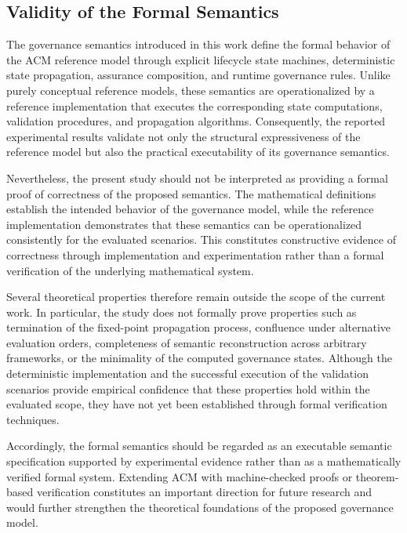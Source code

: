 \documentclass[10pt]{article}
\begin{document}
\subsection{Validity of the Formal Semantics}
\label{sec:validity_formal_semantics}

The governance semantics introduced in this work define the formal behavior of the ACM reference model through explicit lifecycle state machines, deterministic state propagation, assurance composition, and runtime governance rules. Unlike purely conceptual reference models, these semantics are operationalized by a reference implementation that executes the corresponding state computations, validation procedures, and propagation algorithms. Consequently, the reported experimental results validate not only the structural expressiveness of the reference model but also the practical executability of its governance semantics.

Nevertheless, the present study should not be interpreted as providing a formal proof of correctness of the proposed semantics. The mathematical definitions establish the intended behavior of the governance model, while the reference implementation demonstrates that these semantics can be operationalized consistently for the evaluated scenarios. This constitutes constructive evidence of correctness through implementation and experimentation rather than a formal verification of the underlying mathematical system.

Several theoretical properties therefore remain outside the scope of the current work. In particular, the study does not formally prove properties such as termination of the fixed-point propagation process, confluence under alternative evaluation orders, completeness of semantic reconstruction across arbitrary frameworks, or the minimality of the computed governance states. Although the deterministic implementation and the successful execution of the validation scenarios provide empirical confidence that these properties hold within the evaluated scope, they have not yet been established through formal verification techniques.

Accordingly, the formal semantics should be regarded as an executable semantic specification supported by experimental evidence rather than as a mathematically verified formal system. Extending ACM with machine-checked proofs or theorem-based verification constitutes an important direction for future research and would further strengthen the theoretical foundations of the proposed governance model.
\end{document}
